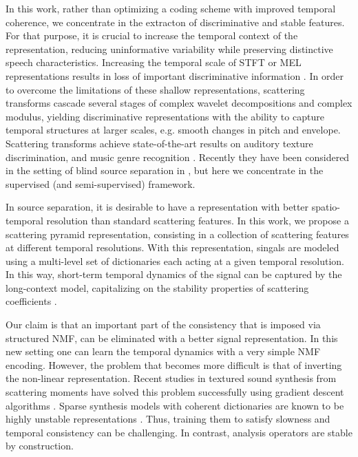In this work, rather than optimizing a coding scheme with improved temporal coherence, 
we concentrate in the extracton of discriminative and stable features. 
For that purpose, it is crucial to increase the temporal context of the representation, 
reducing uninformative variability while preserving distinctive speech characteristics.
Increasing the temporal scale of STFT or MEL representations results 
in loss of important discriminative information \cite{deepscatt}. 
In order to overcome the limitations of these shallow representations, 
scattering transforms \cite{deepscatt, pami} cascade several 
stages of complex wavelet decompositions and complex modulus, yielding 
discriminative representations with the ability to capture temporal structures at larger scales, 
e.g. smooth changes in pitch and envelope. 
Scattering transforms achieve state-of-the-art results on auditory texture discrimination, and music genre recognition \cite{deepscatt, phdjoan}.
Recently they have been considered in the setting of blind source separation in \cite{stephane_bss}, 
but here we concentrate in the supervised (and semi-supervised) framework.

In source separation, it is desirable to have a representation with better spatio-temporal resolution than standard scattering features. 
In this work, we propose a scattering pyramid representation, consisting in a collection of scattering features at different temporal resolutions.
With this representation, singals are modeled using a multi-level set of dictionaries each acting at a given temporal resolution. 
In this way, short-term temporal dynamics of the signal can be captured by the long-context model, capitalizing on the stability properties of scattering coefficients \cite{pami}.


Our claim is that an important part of the consistency that is imposed via structured NMF, can be eliminated with a better signal representation.
In this new setting one can learn the temporal dynamics with a very simple NMF encoding. 
However, the problem that becomes
more difficult is that of inverting the non-linear representation. 
Recent studies in textured sound synthesis from scattering
moments have solved this problem successfully using gradient descent algorithms \cite{bruna2013audio}.
Sparse synthesis models with coherent dictionaries are known to be highly unstable representations \cite{jenatton2012local}. 
Thus, training them to satisfy slowness and temporal consistency can be challenging. 
In contrast, analysis operators are stable by construction.

